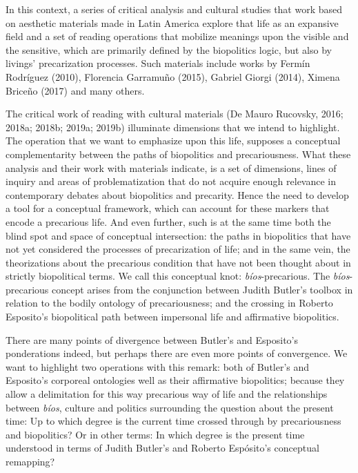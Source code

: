 \documentclass[a4paper,]{scrartcl}
\begin{document}
In this context, a series of critical analysis and cultural studies that
work based on aesthetic materials made in Latin America explore that
life as an expansive field and a set of reading operations that mobilize
meanings upon the visible and the sensitive, which are primarily defined
by the biopolitics logic, but also by livings' precarization processes.
Such materials include works by Fermín Rodríguez (2010), Florencia
Garramuño (2015), Gabriel Giorgi (2014), Ximena Briceño (2017) and many
others.

The critical work of reading with cultural materials (De Mauro Rucovsky,
2016; 2018a; 2018b; 2019a; 2019b) illuminate dimensions that we intend
to highlight. The operation that we want to emphasize upon this life,
supposes a conceptual complementarity between the paths of biopolitics
and precariousness. What these analysis and their work with materials
indicate, is a set of dimensions, lines of inquiry and areas of
problematization that do not acquire enough relevance in contemporary
debates about biopolitics and precarity. Hence the need to develop a
tool for a conceptual framework, which can account for these markers
that encode a precarious life. And even further, such is at the same
time both the blind spot and space of conceptual intersection: the paths
in biopolitics that have not yet considered the processes of
precarization of life; and in the same vein, the theorizations about the
precarious condition that have not been thought about in strictly
biopolitical terms. We call this conceptual knot:
\emph{bíos}-precarious. The \emph{bíos}-precarious concept arises from
the conjunction between Judith Butler's toolbox in relation to the
bodily ontology of precariousness; and the crossing in Roberto
Esposito's biopolitical path between impersonal life and affirmative
biopolitics.

There are many points of divergence between Butler's and Esposito's
ponderations indeed, but perhaps there are even more points of
convergence. We want to highlight two operations with this remark: both
of Butler's and Esposito's corporeal ontologies well as their
affirmative biopolitics; because they allow a delimitation for this way
precarious way of life and the relationships between \emph{bíos},
culture and politics surrounding the question about the present time: Up
to which degree is the current time crossed through by precariousness
and biopolitics? Or in other terms: In which degree is the present time
understood in terms of Judith Butler's and Roberto Espósito's conceptual
remapping?
\end{document}
